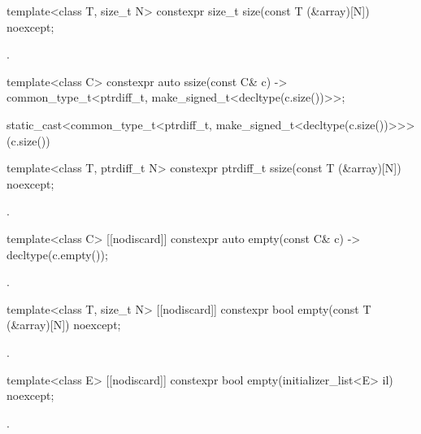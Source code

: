 %
\begin{itemdecl}
template<class T, size_t N> constexpr size_t size(const T (&array)[N]) noexcept;
\end{itemdecl}
\begin{itemdescr}
\pnum
\returns
{}.
\end{itemdescr}

%
\begin{itemdecl}
template<class C> constexpr auto ssize(const C& c)
  -> common_type_t<ptrdiff_t, make_signed_t<decltype(c.size())>>;
\end{itemdecl}
\begin{itemdescr}
\pnum
\returns
\begin{codeblock}
static_cast<common_type_t<ptrdiff_t, make_signed_t<decltype(c.size())>>>(c.size())
\end{codeblock}
\end{itemdescr}

%
\begin{itemdecl}
template<class T, ptrdiff_t N> constexpr ptrdiff_t ssize(const T (&array)[N]) noexcept;
\end{itemdecl}
\begin{itemdescr}
\pnum
\returns
{}.
\end{itemdescr}

%
\begin{itemdecl}
template<class C> [[nodiscard]] constexpr auto empty(const C& c) -> decltype(c.empty());
\end{itemdecl}
\begin{itemdescr}
\pnum
\returns
{}.
\end{itemdescr}

%
\begin{itemdecl}
template<class T, size_t N> [[nodiscard]] constexpr bool empty(const T (&array)[N]) noexcept;
\end{itemdecl}
\begin{itemdescr}
\pnum
\returns
{}.
\end{itemdescr}

%
\begin{itemdecl}
template<class E> [[nodiscard]] constexpr bool empty(initializer_list<E> il) noexcept;
\end{itemdecl}
\begin{itemdescr}
\pnum
\returns
{}.
\end{itemdescr}

